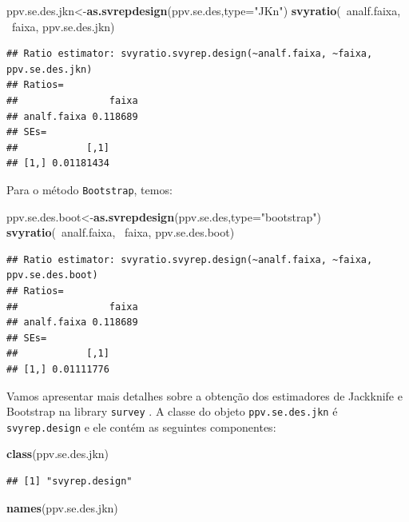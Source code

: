 \documentclass[]{book}
\newenvironment{Shaded}{\begin{snugshade}}{\end{snugshade}}
\newcommand{\KeywordTok}[1]{\textcolor[rgb]{0.13,0.29,0.53}{\textbf{{#1}}}}
\newcommand{\DataTypeTok}[1]{\textcolor[rgb]{0.13,0.29,0.53}{{#1}}}
\newcommand{\StringTok}[1]{\textcolor[rgb]{0.31,0.60,0.02}{{#1}}}
\newcommand{\NormalTok}[1]{{#1}}
\numberwithin{example}{chapter}
\numberwithin{remark}{chapter}
\numberwithin{definition}{chapter}
\begin{document}
\begin{Shaded}
\begin{Highlighting}[]
\NormalTok{ppv.se.des.jkn<-}\KeywordTok{as.svrepdesign}\NormalTok{(ppv.se.des,}\DataTypeTok{type=}\StringTok{"JKn"}\NormalTok{)}
\KeywordTok{svyratio}\NormalTok{(~analf.faixa, ~faixa, ppv.se.des.jkn)}
\end{Highlighting}
\end{Shaded}

\begin{verbatim}
## Ratio estimator: svyratio.svyrep.design(~analf.faixa, ~faixa, ppv.se.des.jkn)
## Ratios=
##                faixa
## analf.faixa 0.118689
## SEs=
##            [,1]
## [1,] 0.01181434
\end{verbatim}

Para o método \texttt{Bootstrap}, temos:

\begin{Shaded}
\begin{Highlighting}[]
\NormalTok{ppv.se.des.boot<-}\KeywordTok{as.svrepdesign}\NormalTok{(ppv.se.des,}\DataTypeTok{type=}\StringTok{"bootstrap"}\NormalTok{)}
\KeywordTok{svyratio}\NormalTok{(~analf.faixa, ~faixa, ppv.se.des.boot)}
\end{Highlighting}
\end{Shaded}

\begin{verbatim}
## Ratio estimator: svyratio.svyrep.design(~analf.faixa, ~faixa, ppv.se.des.boot)
## Ratios=
##                faixa
## analf.faixa 0.118689
## SEs=
##            [,1]
## [1,] 0.01111776
\end{verbatim}

Vamos apresentar mais detalhes sobre a obtenção dos estimadores de
Jackknife e Bootstrap na library \texttt{survey} \citep{R-survey}. A
classe do objeto \texttt{ppv.se.des.jkn} é \texttt{svyrep.design} e ele
contém as seguintes componentes:

\begin{Shaded}
\begin{Highlighting}[]
\KeywordTok{class}\NormalTok{(ppv.se.des.jkn)}
\end{Highlighting}
\end{Shaded}

\begin{verbatim}
## [1] "svyrep.design"
\end{verbatim}

\begin{Shaded}
\begin{Highlighting}[]
\KeywordTok{names}\NormalTok{(ppv.se.des.jkn)}
\end{Highlighting}
\end{Shaded}
\end{document}
